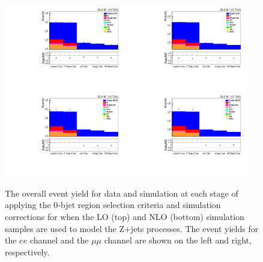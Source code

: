\begin{figure}[!h]
\centering
\includegraphics[width=0.47\textwidth]{figs/background-estimation/plots/unblinded/DY_control_old_prompt_ee_ttbarInc/cutFlow_log.pdf}
\includegraphics[width=0.47\textwidth]{figs/background-estimation/plots/unblinded/DY_control_old_prompt_mumu_ttbarInc/cutFlow_log.pdf}
\\
\includegraphics[width=0.47\textwidth]{figs/background-estimation/plots/unblinded/DY_control_old_prompt_ee_DYamcatnlo/cutFlow_log.pdf}
\includegraphics[width=0.47\textwidth]{figs/background-estimation/plots/unblinded/DY_control_old_prompt_mumu_DYamcatnlo/cutFlow_log.pdf}
\caption{
The overall event yield for data and simulation at each stage of applying the 0-bjet region selection criteria and simulation corrections for when the LO (top) and NLO (bottom) simulation samples are used to model the Z+jets processes.
The event yields for the $ee$ channel and the $\mu\mu$ channel are shown on the left and right, respectively.
}
\label{fig:zPlus_cutFlow}
\end{figure}

